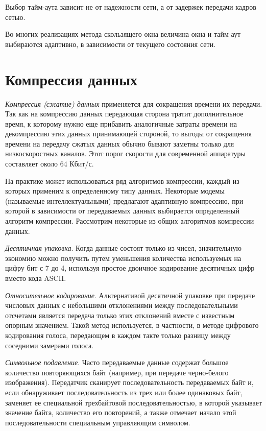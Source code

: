 Выбор тайм-аута зависит не от надежности сети, а от задержек передачи кадров сетью.

Во многих реализациях метода скользящего окна величина окна и тайм-аут выбираются адаптивно, в зависимости от текущего состояния сети.

\section{Компрессия данных}

\emph{Компрессия (сжатие) данных} применяется для сокращения времени их передачи.
Так как на компрессию данных передающая сторона тратит дополнительное время, к которому нужно еще прибавить аналогичные затраты времени на декомпрессию этих данных принимающей стороной, то выгоды от сокращения времени на передачу сжатых данных обычно бывают заметны только для низкоскоростных каналов.
Этот порог скорости для современной аппаратуры составляет около 64 Кбит/с.

На практике может использоваться ряд алгоритмов компрессии, каждый из которых применим к определенному типу данных.
Некоторые модемы (называемые интеллектуальными) предлагают адаптивную компрессию, при которой в зависимости от передаваемых данных выбирается определенный алгоритм компрессии.
Рассмотрим некоторые из общих алгоритмов компрессии данных.

\emph{Десятичная упаковка}.
Когда данные состоят только из чисел, значительную экономию можно получить путем уменьшения количества используемых на цифру бит с 7 до 4, используя простое двоичное кодирование десятичных цифр вместо кода ASCII.

\emph{Относительное кодирование}.
Альтернативой десятичной упаковке при передаче числовых данных с небольшими отклонениями между последовательными отсчетами является передача только этих отклонений вместе с известным опорным значением.
Такой метод используется, в частности, в методе цифрового кодирования голоса, передающем в каждом такте только разницу между соседними замерами голоса.

\emph{Символьное подавление}.
Часто передаваемые данные содержат большое количество повторяющихся байт (например, при передаче черно-белого изображения).
Передатчик сканирует последовательность передаваемых байт и, если обнаруживает последовательность из трех или более одинаковых байт, заменяет ее специальной трехбайтовой последовательностью, в которой указывает значение байта, количество его повторений, а также отмечает начало этой последовательности специальным управляющим символом.

